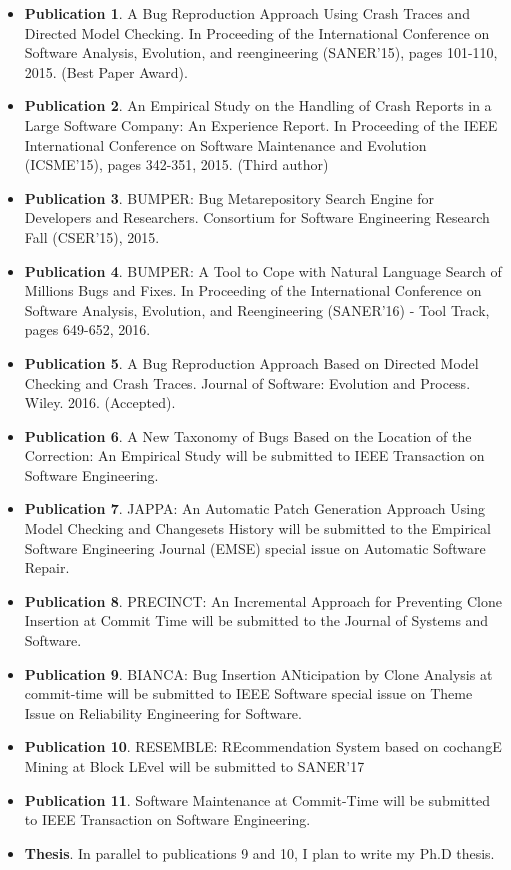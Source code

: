 \begin{itemize}
	\item {\bf Publication 1}. A Bug Reproduction Approach Using Crash Traces and Directed Model Checking. In Proceeding of the International Conference on Software Analysis, Evolution, and reengineering (SANER'15), pages 101-110, 2015. (Best Paper Award).
	\item {\bf Publication 2}. An Empirical Study on the Handling of Crash Reports in a Large Software Company: An Experience Report. In Proceeding of the IEEE International Conference on Software Maintenance and Evolution (ICSME'15), pages 342-351, 2015. (Third author)
	\item {\bf Publication 3}. BUMPER: Bug Metarepository Search Engine for Developers and Researchers. Consortium for Software Engineering Research Fall (CSER'15), 2015.
	\item {\bf Publication 4}. BUMPER: A Tool to Cope with Natural Language Search of Millions Bugs and Fixes. In Proceeding of the International Conference on Software Analysis, Evolution, and Reengineering (SANER'16) - Tool Track, pages 649-652, 2016.
	\item {\bf Publication 5}.  A Bug Reproduction Approach Based on Directed Model Checking and Crash Traces. Journal of Software: Evolution and Process. Wiley. 2016. (Accepted).
	\item {\bf Publication 6}. A New Taxonomy of Bugs Based on the Location of the Correction: An Empirical Study will be submitted to IEEE Transaction on Software Engineering.

	\item {\bf Publication 7}. JAPPA: An Automatic Patch Generation Approach Using Model Checking and Changesets History will be submitted to the Empirical Software Engineering Journal (EMSE) special issue on Automatic Software Repair.

	\item {\bf Publication 8}. PRECINCT: An Incremental Approach for Preventing Clone Insertion at Commit Time will be submitted to the Journal of Systems and Software.

	\item {\bf Publication 9}. BIANCA: Bug Insertion ANticipation by Clone Analysis at commit-time will be submitted to IEEE Software special issue on Theme Issue on Reliability Engineering for Software.

	\item {\bf Publication 10}. RESEMBLE: REcommendation System based on cochangE Mining at Block LEvel will be submitted to SANER'17

	\item {\bf Publication 11}. Software Maintenance at Commit-Time will be submitted to IEEE Transaction on Software Engineering.

	\item {\bf Thesis}. In parallel to publications 9 and 10, I plan to write my Ph.D thesis.
\end{itemize}

